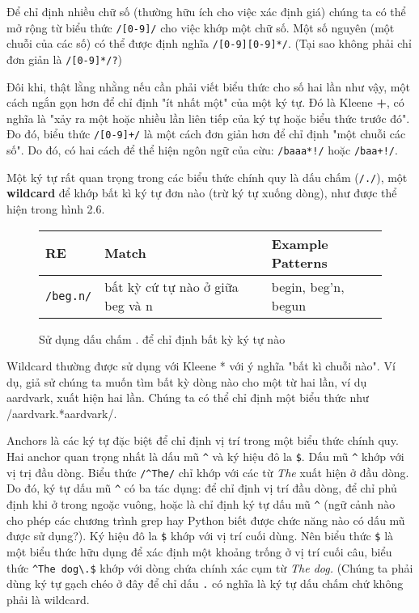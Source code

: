 Để chỉ định nhiều chữ số (thường hữu ích cho việc xác định giá) chúng ta có thể mở rộng từ biểu thức \verb|/[0-9]/| cho việc khớp một chữ số. Một số nguyên (một chuỗi của các số) có thể được định nghĩa \verb|/[0-9][0-9]*/|. (Tại sao không phải chỉ đơn giản là \verb|/[0-9]*/?|)

Đôi khi, thật lằng nhằng nếu cần phải viết biểu thức cho số hai lần như vậy, một cách ngắn gọn hơn để chỉ định "ít nhất một" của một ký tự. Đó là Kleene \textbf{+}, có nghĩa là "xảy ra một hoặc nhiều lần liên tiếp của ký tự hoặc biểu thức trước đó". Đo đó, biểu thức \verb|/[0-9]+/| là một cách đơn giản hơn để chỉ định "một chuỗi các số". Do đó, có hai cách để thể hiện ngôn ngữ của cừu: \verb|/baaa*!/| hoặc \verb|/baa+!/|.

Một ký tự rất quan trọng trong các biểu thức chính quy là dấu chấm (\verb|/./|), một \textbf{wildcard} để khớp bất kì ký tự đơn nào (trừ ký tự xuống dòng), như được thể hiện trong hình 2.6.

\begin{figure}[h]
	\begin{tabular}{ l l l }
	 \hline
	 RE & Match & Example Patterns \\
	 \hline
	 \verb|/beg.n/| & bất kỳ cứ tự nào ở giữa beg và n & begin, beg'n, begun \\
	 \hline
	\end{tabular}
 \caption{Sử dụng dấu chấm . để chỉ định bất kỳ ký tự nào}
 \label{table:2.6}
\end{figure}

Wildcard thường được sử dụng với Kleene * với ý nghĩa "bất kì chuỗi nào". Ví dụ, giả sử chúng ta muốn tìm bất kỳ dòng nào cho một từ hai lần, ví dụ aardvark, xuất hiện hai lần. Chúng ta có thể chỉ định một biểu thức như /aardvark.*aardvark/.

Anchors là các ký tự đặc biệt để chỉ định vị trí trong một biểu thức chính quy. Hai anchor quan trọng nhất là dấu mũ \verb|^| và ký hiệu đô la \verb|$|. Dấu mũ \verb|^| khớp với vị trị đầu dòng. Biểu thức \verb|/^The/| chỉ khớp với các từ \textit{The} xuất hiện ở đầu dòng. Do đó, ký tự dấu mũ \verb|^| có ba tác dụng: để chỉ định vị trí đầu dòng, để chỉ phủ định khi ở trong ngoặc vuông, hoặc là chỉ định ký tự dấu mũ \verb|^| (ngữ cảnh nào cho phép các chương trình grep hay Python biết được chức năng nào có dấu mũ được sử dụng?). Ký hiệu đô la \verb|$| khớp với vị trí cuối dùng. Nên biểu thức \textvisiblespace \verb|$| là một biểu thức hữu dụng để xác định một khoảng trống ở vị trí cuối câu, biểu thức \verb|^The dog\.$| khớp với dòng chứa chính xác cụm từ \textit{The dog.} (Chúng ta phải dùng ký tự gạch chéo ở đây để chỉ dấu \verb|.| có nghĩa là ký tự dấu chấm chứ không phải là wildcard.

